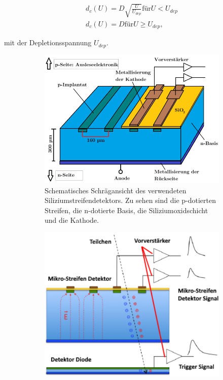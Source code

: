 \begin{equation}
  \begin{split}
    d_c(U) = D \sqrt{\frac{U}{U_{dep}}} \text{für} U < U_{dep} \\
    d_c(U) = D  \text{für} U \geq U_{dep},
  \end{split}
\end{equation}

mit der Depletionsspannung $U_{dep}$.


\begin{figure}
  \begin{subfigure}{0.45\textwidth}
    \centering
    \includegraphics[width=\linewidth]{content/graphics/schrag.png}
    \caption{Schematisches Schrägansicht des verwendeten Siliziumstreifendetektors. Zu sehen sind die p-dotierten Streifen, die n-dotierte Basis, die Siliziumoxidschicht und die Kathode.}
    \label{fig:schragansicht}
  \end{subfigure}%
  \begin{subfigure}{0.45\textwidth}
    \centering
    \includegraphics[width=\linewidth]{content/graphics/trig.png}

\end{subfigure}
\end{figure}
